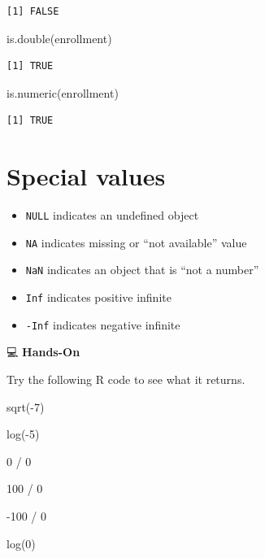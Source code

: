 \documentclass[
  letterpaper,
  DIV=11,
  numbers=noendperiod]{scrreprt}
\newenvironment{Shaded}{\begin{snugshade}}{\end{snugshade}}
\newcommand{\DecValTok}[1]{\textcolor[rgb]{0.68,0.00,0.00}{#1}}
\newcommand{\FunctionTok}[1]{\textcolor[rgb]{0.28,0.35,0.67}{#1}}
\newcommand{\NormalTok}[1]{\textcolor[rgb]{0.00,0.23,0.31}{#1}}
\newcommand{\SpecialCharTok}[1]{\textcolor[rgb]{0.37,0.37,0.37}{#1}}
\begin{document}
\begin{tcolorbox}
\begin{verbatim}
[1] FALSE
\end{verbatim}

\begin{Shaded}
\begin{Highlighting}[]
\FunctionTok{is.double}\NormalTok{(enrollment)}
\end{Highlighting}
\end{Shaded}

\begin{verbatim}
[1] TRUE
\end{verbatim}

\begin{Shaded}
\begin{Highlighting}[]
\FunctionTok{is.numeric}\NormalTok{(enrollment)  }
\end{Highlighting}
\end{Shaded}

\begin{verbatim}
[1] TRUE
\end{verbatim}

\end{tcolorbox}

\section{Special values}\label{special-values}

\begin{itemize}
\item
  \texttt{NULL} indicates an undefined object
\item
  \texttt{NA} indicates missing or ``not available'' value
\item
  \texttt{NaN} indicates an object that is ``not a number''
\item
  \texttt{Inf} indicates positive infinite
\item
  \texttt{-Inf} indicates negative infinite
\end{itemize}

💻 \textbf{Hands-On}

Try the following R code to see what it returns.

\begin{Shaded}
\begin{Highlighting}[]
\FunctionTok{sqrt}\NormalTok{(}\SpecialCharTok{{-}}\DecValTok{7}\NormalTok{)}

\FunctionTok{log}\NormalTok{(}\SpecialCharTok{{-}}\DecValTok{5}\NormalTok{)}

\DecValTok{0} \SpecialCharTok{/} \DecValTok{0}

\DecValTok{100} \SpecialCharTok{/} \DecValTok{0}

\SpecialCharTok{{-}}\DecValTok{100} \SpecialCharTok{/} \DecValTok{0}

\FunctionTok{log}\NormalTok{(}\DecValTok{0}\NormalTok{)}
\end{Highlighting}
\end{Shaded}
\end{document}

